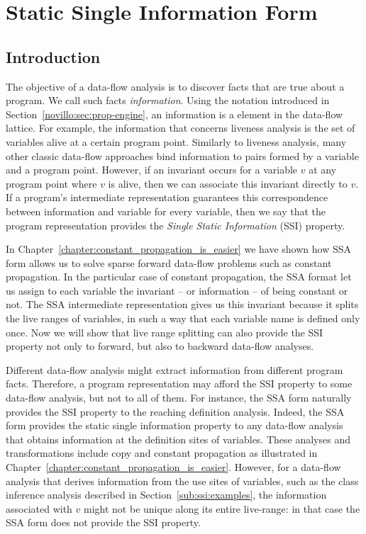 \chapter{Static Single Information Form }
\label{chap:ssi}

\graphicspath{{img/}{ssi/img/}{part2/ssi/img/}}

\section{Introduction}
\label{sec:ssi:pereira:intro}

The objective of a data-flow analysis is to discover facts that are true about a
program.
We call such facts {\em information}.
Using the notation introduced in Section~\ref{novillo:sec:prop-engine}, an
information is a element in the data-flow lattice.
For example, the information that concerns liveness analysis is the set of
variables alive at a certain program point.
Similarly to liveness analysis, many other classic data-flow approaches bind
information to pairs formed by a variable and a program point.
However, if an invariant occurs for a variable $v$ at any program point where
$v$ is alive, then we can associate this invariant directly to $v$.
If a program's intermediate representation guarantees this correspondence between
information and variable for every variable, then we say that the program
representation provides the {\em Single Static Information} (SSI) property.

In Chapter~\ref{chapter:constant_propagation_is_easier} we have shown how SSA form allows us to solve sparse forward data-flow problems such as constant propagation.
In the particular case of constant propagation, the SSA format let us assign to each variable the invariant -- or information -- of being constant or not.
The SSA intermediate representation gives us this invariant because it splits the live ranges of variables, in such a way that each variable name is defined only once.
Now we will show that live range splitting can also provide the SSI property not only to forward, but also to backward data-flow analyses.

Different data-flow analysis might extract information from different program
facts.
Therefore, a program representation may afford the SSI property to some data-flow
analysis, but not to all of them.
For instance, the SSA form naturally provides the SSI property to the reaching
definition analysis.
Indeed, the SSA form provides the static single information property to any
data-flow analysis that obtains information at the definition sites of
variables.
These analyses and transformations include copy and constant propagation as illustrated in Chapter~\ref{chapter:constant_propagation_is_easier}.
However, for a data-flow analysis that derives information from the use sites of variables, such as the class inference analysis described in Section~\ref{sub:ssi:examples}, the information associated with $v$ might not be unique along its entire live-range: in that case the SSA form does not provide the SSI property.

